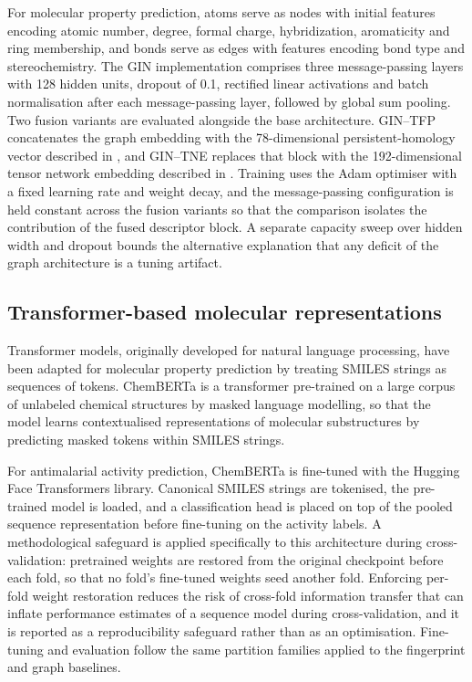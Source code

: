 For molecular property prediction, atoms serve as nodes with initial features encoding atomic number, degree, formal charge, hybridization, aromaticity and ring membership, and bonds serve as edges with features encoding bond type and stereochemistry. The GIN implementation comprises three message-passing layers with \num{128} hidden units, dropout of \num{0.1}, rectified linear activations and batch normalisation after each message-passing layer, followed by global sum pooling. Two fusion variants are evaluated alongside the base architecture. GIN--TFP concatenates the graph embedding with the \num{78}-dimensional persistent-homology vector described in , and GIN--TNE replaces that block with the \num{192}-dimensional tensor network embedding described in . Training uses the Adam optimiser with a fixed learning rate and weight decay, and the message-passing configuration is held constant across the fusion variants so that the comparison isolates the contribution of the fused descriptor block. A separate capacity sweep over hidden width and dropout bounds the alternative explanation that any deficit of the graph architecture is a tuning artifact.

\subsection{Transformer-based molecular representations}

Transformer models, originally developed for natural language processing, have been adapted for molecular property prediction by treating SMILES strings as sequences of tokens. ChemBERTa is a transformer pre-trained on a large corpus of unlabeled chemical structures by masked language modelling, so that the model learns contextualised representations of molecular substructures by predicting masked tokens within SMILES strings.

For antimalarial activity prediction, ChemBERTa is fine-tuned with the Hugging Face Transformers library. Canonical SMILES strings are tokenised, the pre-trained model is loaded, and a classification head is placed on top of the pooled sequence representation before fine-tuning on the activity labels. A methodological safeguard is applied specifically to this architecture during cross-validation: pretrained weights are restored from the original checkpoint before each fold, so that no fold's fine-tuned weights seed another fold. Enforcing per-fold weight restoration reduces the risk of cross-fold information transfer that can inflate performance estimates of a sequence model during cross-validation, and it is reported as a reproducibility safeguard rather than as an optimisation. Fine-tuning and evaluation follow the same partition families applied to the fingerprint and graph baselines.

